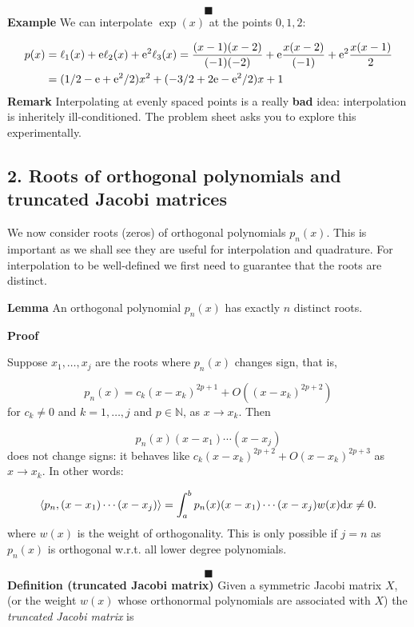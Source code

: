 \documentclass[12pt,a4paper]{article}
\begin{document}
\[
\blacksquare
\]
\textbf{Example} We can interpolate $\exp(x)$ at the points $0,1,2$:


\begin{align*}
p(x) &= \ensuremath{\ell}_1(x) + {\rm e} \ensuremath{\ell}_2(x) + {\rm e}^2 \ensuremath{\ell}_3(x) =
{(x - 1) (x-2) \over (-1)(-2)} + {\rm e} {x (x-2) \over (-1)} +
{\rm e}^2 {x (x-1) \over 2} \\
&= (1/2 - {\rm e} +{\rm e}^2/2)x^2 + (-3/2 + 2 {\rm e}  - {\rm e}^2 /2) x + 1
\end{align*}
\textbf{Remark} Interpolating at evenly spaced points is a really \textbf{bad} idea: interpolation is inheritely ill-conditioned.  The problem sheet asks you to explore this experimentally.

\subsection{2. Roots of orthogonal polynomials and truncated Jacobi matrices}
We now consider roots (zeros) of orthogonal polynomials $p_n(x)$. This is important as we shall see they are useful for interpolation and quadrature. For interpolation to be well-defined we first need to guarantee that the roots are distinct.

\textbf{Lemma} An orthogonal polynomial $p_n(x)$ has exactly $n$ distinct roots.

\textbf{Proof}

Suppose $x_1, \ensuremath{\ldots},x_j$ are the roots where $p_n(x)$ changes sign, that is,

\[
p_n(x) = c_k (x-x_k)^{2p+1} + O((x-x_k)^{2p+2})
\]
for $c_k \ensuremath{\ne} 0$ and $k = 1,\ensuremath{\ldots},j$ and $p \ensuremath{\in} \mathbb{N}$, as $x \ensuremath{\rightarrow} x_k$. Then

\[
p_n(x) (x-x_1) \ensuremath{\cdots}(x-x_j)
\]
does not change signs: it behaves like $c_k (x-x_k)^{2p+2} + O(x-x_k)^{2p+3}$ as $x \ensuremath{\rightarrow} x_k$. In other words:

\[
\ensuremath{\langle}p_n,(x-x_1) \ensuremath{\cdots}(x-x_j) \ensuremath{\rangle} = \int_a^b p_n(x) (x-x_1) \ensuremath{\cdots}(x-x_j) w(x) {\rm d} x \ensuremath{\ne} 0.
\]
where $w(x)$ is the weight of orthogonality. This is only possible if $j = n$ as $p_n(x)$ is orthogonal w.r.t. all lower degree polynomials.

\[
\blacksquare
\]
\textbf{Definition (truncated Jacobi matrix)} Given a symmetric Jacobi matrix $X$, (or the weight $w(x)$ whose orthonormal polynomials are associated with $X$)  the \emph{truncated Jacobi matrix} is
\end{document}
